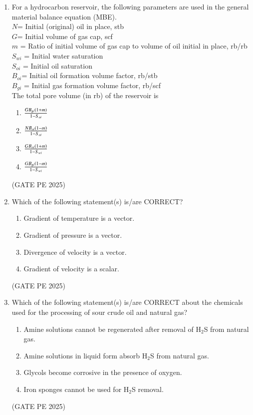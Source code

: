 \documentclass[journal,12pt,onecolumn]{IEEEtran}
\theoremstyle{remark}
\begin{document}
\begin{enumerate}
\item For a hydrocarbon reservoir, the following parameters are used in the general material balance equation (MBE).\\
$N$= Initial (original) oil in place, stb\\
$G$= Initial volume of gas cap, scf\\
$m$ = Ratio of initial volume of gas cap to volume of oil initial in place, rb/rb\\
$S_{wi}$ = Initial water saturation\\
$S_{oi}$  = Initial oil saturation\\
$B_{oi}$= Initial oil formation volume factor, rb/stb\\
$B_{gi}$ = Initial gas formation volume factor, rb/scf\\
The total pore volume (in rb) of the reservoir is
\begin{enumerate}
    \item $\frac{GB_{gi}\left(1+m\right)}{1-S_{oi}}$
    \item $\frac{NB_{oi}\left(1-m\right)}{1-S_{oi}}$
    \item $\frac{GB_{oi}\left(1+m\right)}{1-S_{wi}}$
    \item $\frac{GB_{gi}\left(1-m\right)}{1-S_{wi}}$
\end{enumerate}
\hfill{(GATE PE 2025)}

\item Which of the following statement(s) is/are CORRECT?
\begin{enumerate}
    \item Gradient of temperature is a vector.
    \item Gradient of pressure is a vector.
    \item Divergence of velocity is a vector.
    \item Gradient of velocity is a scalar.
\end{enumerate}
\hfill{(GATE PE 2025)}

\item Which of the following statement(s) is/are CORRECT about the chemicals used for the processing of sour crude oil and natural gas?
\begin{enumerate}
    \item Amine solutions cannot be regenerated after removal of H$_2$S from natural gas.
    \item Amine solutions in liquid form absorb H$_2$S from natural gas.
    \item Glycols become corrosive in the presence of oxygen.
    \item Iron sponges cannot be used for H$_2$S removal.
\end{enumerate}
\hfill{(GATE PE 2025)}


\end{enumerate}
\end{document}
